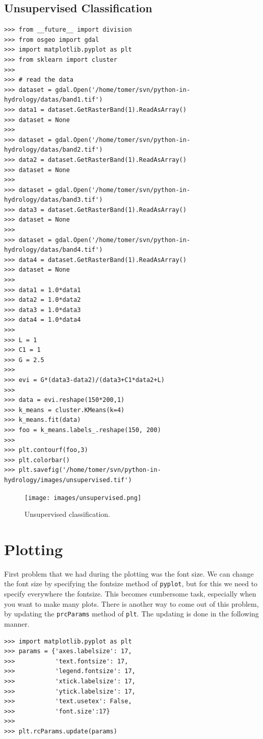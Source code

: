 \documentclass[10pt]{book}
\begin{document}
\section{Unsupervised Classification}
\beforeverb \begin{verbatim}
>>> from __future__ import division
>>> from osgeo import gdal
>>> import matplotlib.pyplot as plt
>>> from sklearn import cluster
>>> 
>>> # read the data
>>> dataset = gdal.Open('/home/tomer/svn/python-in-hydrology/datas/band1.tif')
>>> data1 = dataset.GetRasterBand(1).ReadAsArray()
>>> dataset = None
>>> 
>>> dataset = gdal.Open('/home/tomer/svn/python-in-hydrology/datas/band2.tif')
>>> data2 = dataset.GetRasterBand(1).ReadAsArray()
>>> dataset = None
>>> 
>>> dataset = gdal.Open('/home/tomer/svn/python-in-hydrology/datas/band3.tif')
>>> data3 = dataset.GetRasterBand(1).ReadAsArray()
>>> dataset = None
>>> 
>>> dataset = gdal.Open('/home/tomer/svn/python-in-hydrology/datas/band4.tif')
>>> data4 = dataset.GetRasterBand(1).ReadAsArray()
>>> dataset = None
>>> 
>>> data1 = 1.0*data1
>>> data2 = 1.0*data2
>>> data3 = 1.0*data3
>>> data4 = 1.0*data4
>>> 
>>> L = 1
>>> C1 = 1
>>> G = 2.5
>>> 
>>> evi = G*(data3-data2)/(data3+C1*data2+L)
>>> 
>>> data = evi.reshape(150*200,1)
>>> k_means = cluster.KMeans(k=4)
>>> k_means.fit(data) 
>>> foo = k_means.labels_.reshape(150, 200)
>>> 
>>> plt.contourf(foo,3)
>>> plt.colorbar()
>>> plt.savefig('/home/tomer/svn/python-in-hydrology/images/unsupervised.tif')
\end{verbatim} \afterverb

\beforefig
\begin{figure}[h!]
  \centering
    \texttt{[image: images/unsupervised.png]}
  \caption{Unsupervised classification.}
   \label{fig:unsuper}
\end{figure}
\afterfig


\chapter{Plotting}
First problem that we had during the plotting was the font size. We can change the font size by specifying the fontsize method of \verb"pyplot", but for this we need to specify everywhere the fontsize. This becomes cumbersome task, especially when you want to make many plots. There is another way to come out of this problem, by updating the \verb"prcParams" method of \verb"plt". The updating is done in the following manner. 

\beforeverb
\begin{verbatim}
>>> import matplotlib.pyplot as plt
>>> params = {'axes.labelsize': 17, 
>>>           'text.fontsize': 17,
>>>           'legend.fontsize': 17,
>>>           'xtick.labelsize': 17,
>>>           'ytick.labelsize': 17,
>>>           'text.usetex': False,
>>>           'font.size':17}
>>> 
>>> plt.rcParams.update(params)
\end{verbatim}
\afterverb
{}
\end{document}
